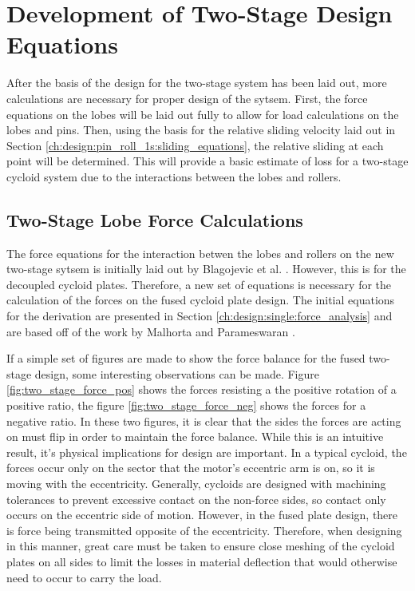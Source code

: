 \section{Development of Two-Stage Design Equations} \label{ch:dual:equations}

After the basis of the design for the two-stage system has been laid out, more calculations are necessary for proper design of the sytsem. First, the force equations on the lobes will be laid out fully to allow for load calculations on the lobes and pins. Then, using the basis for the relative sliding velocity laid out in Section \ref{ch:design:pin_roll_1s:sliding_equations}, the relative sliding at each point will be determined. This will provide a basic estimate of loss for a two-stage cycloid system due to the interactions between the lobes and rollers. 

\subsection{Two-Stage Lobe Force Calculations} \label{ch:dual:equtions:force}

The force equations for the interaction betwen the lobes and rollers on the new two-stage sytsem is initially laid out by Blagojevic et al. \cite{ref:new_two_stage}. However, this is for the decoupled cycloid plates. Therefore, a new set of equations is necessary for the calculation of the forces on the fused cycloid plate design. The initial equations for the derivation are presented in Section \ref{ch:design:single:force_analysis} and are based off of the work by Malhorta and Parameswaran \cite{ref:malhorta}. 

If a simple set of figures are made to show the force balance for the fused two-stage design, some interesting observations can be made. Figure \ref{fig:two_stage_force_pos} shows the forces resisting a the positive rotation of a positive ratio, the figure \ref{fig:two_stage_force_neg} shows the forces for a negative ratio. In these two figures, it is clear that the sides the forces are acting on must flip in order to maintain the force balance. While this is an intuitive result, it's physical implications for design are important. In a typical cycloid, the forces occur only on the sector that the motor's eccentric arm is on, so it is moving with the eccentricity. Generally, cycloids are designed with machining tolerances to prevent excessive contact on the non-force sides, so contact only occurs on the eccentric side of motion. However, in the fused plate design, there is force being transmitted opposite of the eccentricity. Therefore, when designing in this manner, great care must be taken to ensure close meshing of the cycloid plates on all sides to limit the losses in material deflection that would otherwise need to occur to carry the load. 



